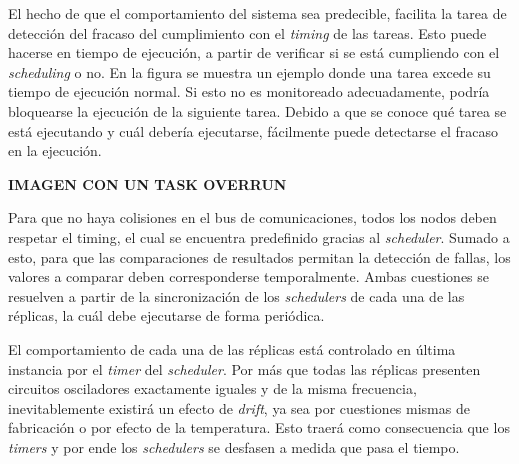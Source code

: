 
El hecho de que el comportamiento del sistema sea predecible, facilita la tarea de detección del fracaso del cumplimiento con el \textit{timing} de las tareas. Esto puede hacerse en tiempo de ejecución, a partir de verificar si se está cumpliendo con el \textit{scheduling} o no. En la figura  se muestra un ejemplo donde una tarea excede su tiempo de ejecución normal. Si esto no es monitoreado adecuadamente, podría bloquearse la ejecución de la siguiente tarea. Debido a que se conoce qué tarea se está ejecutando y cuál debería ejecutarse, fácilmente puede detectarse el fracaso en la ejecución.

{\Large \textbf{{\color{red} IMAGEN CON UN TASK OVERRUN}}}



Para que no haya colisiones en el bus de comunicaciones, todos los nodos deben respetar el timing, el cual se encuentra predefinido gracias al \textit{scheduler}. Sumado a esto, para que las comparaciones de resultados permitan la detección de fallas, los valores a comparar deben corresponderse temporalmente. Ambas cuestiones se resuelven a partir de la sincronización de los \textit{schedulers} de cada una de las réplicas, la cuál debe ejecutarse de forma periódica.

El comportamiento de cada una de las réplicas está controlado en última instancia por el \textit{timer} del \textit{scheduler}. Por más que todas las réplicas presenten circuitos osciladores exactamente iguales y de la misma frecuencia, inevitablemente existirá un efecto de \textit{drift}, ya sea por cuestiones mismas de fabricación o por efecto de la temperatura. Esto traerá como consecuencia que los \textit{timers} y por ende los \textit{schedulers} se desfasen a medida que pasa el tiempo. 

